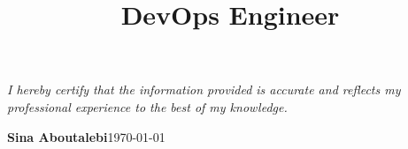 \documentclass[11pt, a4paper, sans, final]{moderncv}
\title{DevOps Engineer}
\begin{document}
\maketitle







\emptysection{}\closesection{}
\vfill
\begin{center}
    \textit{I hereby certify that the information provided is accurate and reflects my professional experience to the best of my knowledge.}
    \vspace{1em}

    \textbf{Sina Aboutalebi}\hspace{4cm}\today
\end{center}
\end{document}
